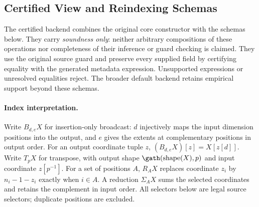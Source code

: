 \subsection{Certified View and Reindexing Schemas}
\label{app:axis-extensions}
The certified backend combines the original core constructor with the schemas
below. They carry
\emph{soundness only}: neither arbitrary compositions of these operations
nor completeness of their inference or guard checking is claimed.
They use the original source guard and preserve every supplied field by
certifying equality with the generated metadata expression. Unsupported
expressions or unresolved equalities reject. The broader default backend
retains empirical support beyond these schemas.

\paragraph{Index interpretation.}
Write $B_{d,e}X$ for insertion-only broadcast: $d$ injectively maps the
input dimension positions into the output, and $e$ gives the extents at
complementary positions in output order. For an output coordinate tuple
$z$, $(B_{d,e}X)[z]=X[z[d]]$. Write $T_pX$ for transpose, with output shape
$\gath(\operatorname{shape}(X),p)$ and input coordinate $z[p^{-1}]$.
For a set of positions $A$, $R_AX$ replaces coordinate $z_i$ by
$n_i-1-z_i$ exactly when $i\in A$. A reduction $\Sigma_AX$ sums the selected
coordinates and retains the complement in input order. All selectors
below are legal source selectors; duplicate positions are excluded.

